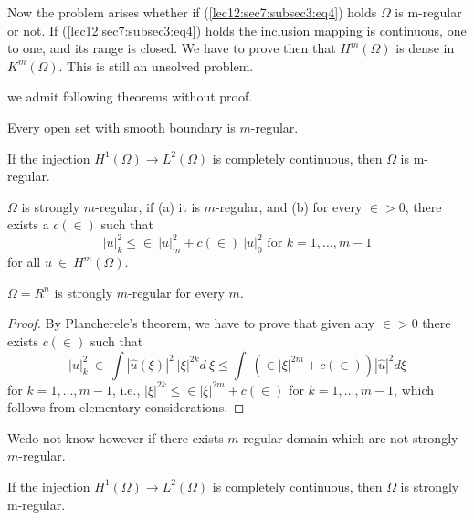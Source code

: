  Now the problem arises whether if (\ref{lec12:sec7:subsec3:eq4}) holds $\Omega$ is m-regular
 or not. If (\ref{lec12:sec7:subsec3:eq4}) holds the inclusion mapping is continuous, one to
 one, and its range is closed. We have to prove then that
 $H^m(\Omega)$ is dense in $K^m(\Omega)$. This is still an unsolved
 problem. 

we admit following theorems without proof.
\begin{theorem}\label{lec12:sec7:subsec3:thm7.4} %
  Every open set with smooth boundary is $m$-regular.
\end{theorem}

\begin{theorem}\label{lec12:sec7:subsec3:thm7.5}%
  If the injection $H^1(\Omega) \rightarrow L^2 (\Omega)$ is completely
  continuous, then $\Omega$ is m-regular. 
\end{theorem}

\begin{definition}\label{lec12:sec7:subsec3:def7.3}%
  $\Omega$ is strongly $m$-regular, if (a) it is $m$-regular, and (b)
  for every $\in > 0$, there exists a $c(\in)$ such
  that  
  \begin{equation}
    | u |^2_k \le \in ~ | u |^2_m + c(\in) ~ | u |^2_0
    \text{ for } k = 1,\ldots, m-1 \tag{5}\label{lec12:sec7:subsec3:eq5} 
  \end{equation}
  for all $u ~ \in ~ H^m(\Omega)$.
\end{definition}

\begin{proposition}\label{lec12:sec7:subsec3:prop7.1}%
  $\Omega = R^n$ is strongly $m$-regular for every $m$. 
\end{proposition}

\begin{proof}%
 By Plancherele's theorem, we have to prove that given any
 $\in > 0$ there exists $c(\in)$ such that  
 $$
 |u|^2_k ~ \in~ \int | \hat{u}(\xi)|^2 ~ |\xi| ^{2k} d ~ \xi
 \le \int ~ (\in | \xi|^{2m} + c(\in)) |\hat{u}|^2 d
 \xi 
 $$
 for $k = 1, \ldots, m-1$, i.e., $|\xi |^{2k} \le \in|\xi
 |^{2m} + c(\in)$ for $ k = 1, \ldots, m-1$, which follows
 from elementary considerations. 
\end{proof}

We\pageoriginale do not know however if there exists $m$-regular domain which are not
strongly $m$-regular. 

\begin{theorem}\label{lec12:sec7:subsec3:thm7.6}%
  If the injection $H^1(\Omega) \rightarrow L^2 (\Omega)$ is completely
  continuous, then $\Omega$ is strongly m-regular. 
\end{theorem}

